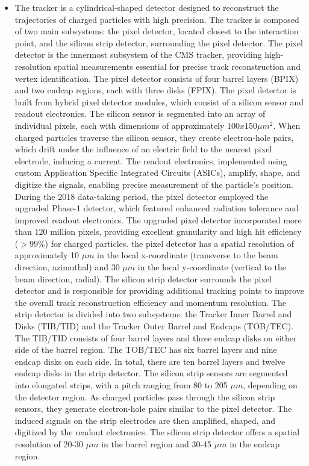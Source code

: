 \begin{itemize}
\item The tracker is a cylindrical-shaped detector designed to reconstruct the trajectories of charged particles with high precision. The tracker is composed of two main subsystems: the pixel detector, located closest to the interaction point, and the silicon strip detector, surrounding the pixel detector. The pixel detector is the innermost subsystem of the CMS tracker, providing high-resolution spatial measurements essential for precise track reconstruction and vertex identification. The pixel detector consists of four barrel layers (BPIX) and two endcap regions, each with three disks (FPIX). The pixel detector is built from hybrid pixel detector modules, which consist of a silicon sensor and readout electronics. The silicon sensor is segmented into an array of individual pixels, each with dimensions of approximately $100 x 150 \mu m^2$. When charged particles traverse the silicon sensor, they create electron-hole pairs, which drift under the influence of an electric field to the nearest pixel electrode, inducing a current. The readout electronics, implemented using custom Application Specific Integrated Circuits (ASICs), amplify, shape, and digitize the signals, enabling precise measurement of the particle's position. During the 2018 data-taking period, the pixel detector employed the upgraded Phase-1 detector, which featured enhanced radiation tolerance and improved readout electronics. The upgraded pixel detector incorporated more than 120 million pixels, providing excellent granularity and high hit efficiency ($>99\%$) for charged particles. the pixel detector has a spatial resolution of approximately 10 $\mu m$ in the local x-coordinate (transverse to the beam direction, azimuthal) and 30 $\mu m$ in the local y-coordinate (vertical to the beam direction, radial). The silicon strip detector surrounds the pixel detector and is responsible for providing additional tracking points to improve the overall track reconstruction efficiency and momentum resolution. The strip detector is divided into two subsystems: the Tracker Inner Barrel and Disks (TIB/TID) and the Tracker Outer Barrel and Endcaps (TOB/TEC). The TIB/TID consists of four barrel layers and three endcap disks on either side of the barrel region. The TOB/TEC has six barrel layers and nine endcap disks on each side. In total, there are ten barrel layers and twelve endcap disks in the strip detector. The silicon strip sensors are segmented into elongated strips, with a pitch ranging from 80 to 205 $\mu m$, depending on the detector region. As charged particles pass through the silicon strip sensors, they generate electron-hole pairs similar to the pixel detector. The induced signals on the strip electrodes are then amplified, shaped, and digitized by the readout electronics. The silicon strip detector offers a spatial resolution of 20-30 $\mu m$ in the barrel region and 30-45 $\mu m$ in the endcap region.


\end{itemize}
